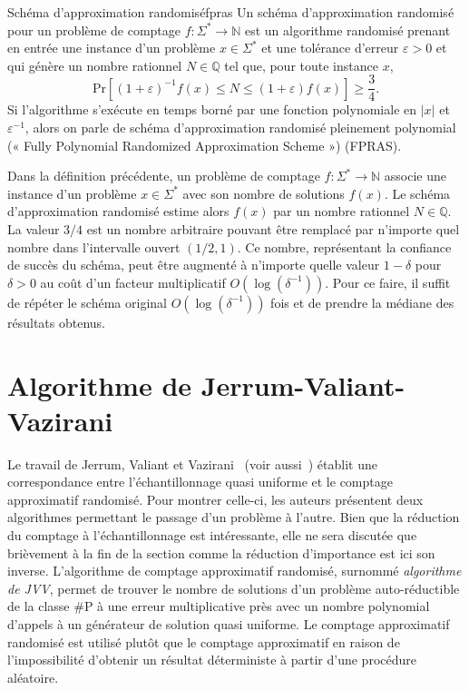\begin{maindefinition}{Schéma d'approximation randomisé}{fpras}
    Un schéma d'approximation randomisé pour un problème de comptage $f: \Sigma^{*} \to \mathbb{N}$ est un algorithme randomisé prenant en entrée une instance d'un problème $x \in \Sigma^{*}$ et une tolérance d'erreur $\varepsilon > 0$ et qui génère un nombre rationnel $N \in \mathbb{Q}$ tel que, pour toute instance $x$,
    \begin{equation*}
        \mathrm{ Pr }\left[(1+\varepsilon)^{-1} f(x) \leq N \leq (1+\varepsilon)f(x)\right] \geq \frac{3}{4} .
    \end{equation*}
    Si l'algorithme s'exécute en temps borné par une fonction polynomiale en $\lvert x \rvert$ et $\varepsilon^{-1}$, alors on parle de schéma d'approximation randomisé pleinement polynomial (« Fully Polynomial Randomized Approximation Scheme ») (FPRAS).
\end{maindefinition}

Dans la définition précédente, un problème de comptage $f: \Sigma^{*} \to \mathbb{N}$ associe une instance d'un problème $x \in \Sigma^{*}$ avec son nombre de solutions $f(x)$. Le schéma d'approximation randomisé estime alors $f(x)$ par un nombre rationnel $N \in \mathbb{Q}$. La valeur $3/4$ est un nombre arbitraire pouvant être remplacé par n'importe quel nombre dans l'intervalle ouvert $(1/2, 1)$. Ce nombre, représentant la confiance de succès du schéma, peut être augmenté à n'importe quelle valeur $1-\delta$ pour $\delta > 0$ au coût d'un facteur multiplicatif $O(\log(\delta^{-1}))$. Pour ce faire, il suffit de répéter le schéma original $O(\log(\delta^{-1}))$ fois et de prendre la médiane des résultats obtenus.   


\section{Algorithme de Jerrum-Valiant-Vazirani}
\label{sec:algorithme-jvv}

Le travail de Jerrum, Valiant et Vazirani~\cite{jerrumRandomGenerationCombinatorial1986} (voir aussi~\cite{broderHowHardIt1986, sinclairAlgorithmsRandomGeneration1993}) établit une correspondance entre l'échantillonnage quasi uniforme et le comptage approximatif randomisé. Pour montrer celle-ci, les auteurs présentent deux algorithmes permettant le passage d'un problème à l'autre. Bien que la réduction du comptage à l'échantillonnage est intéressante, elle ne sera discutée que brièvement à la fin de la section comme la réduction d'importance est ici son inverse. L'algorithme de comptage approximatif randomisé, surnommé \textit{algorithme de JVV}, permet de trouver le nombre de solutions d'un problème auto-réductible de la classe \textsf{\#P} à une erreur multiplicative près avec un nombre polynomial d'appels à un générateur de solution quasi uniforme. Le comptage approximatif randomisé est utilisé plutôt que le comptage approximatif en raison de l'impossibilité d'obtenir un résultat déterministe à partir d'une procédure aléatoire.

